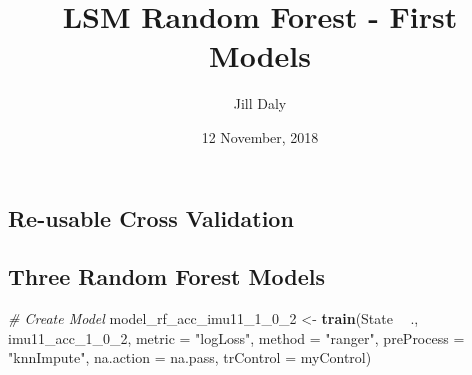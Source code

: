 \documentclass[]{article}
\title{LSM Random Forest - First Models}
\author{Jill Daly}
\date{12 November, 2018}
\newenvironment{Shaded}{\begin{snugshade}}{\end{snugshade}}
\newcommand{\CommentTok}[1]{\textcolor[rgb]{0.56,0.35,0.01}{\textit{#1}}}
\newcommand{\DataTypeTok}[1]{\textcolor[rgb]{0.13,0.29,0.53}{#1}}
\newcommand{\DecValTok}[1]{\textcolor[rgb]{0.00,0.00,0.81}{#1}}
\newcommand{\KeywordTok}[1]{\textcolor[rgb]{0.13,0.29,0.53}{\textbf{#1}}}
\newcommand{\NormalTok}[1]{#1}
\newcommand{\OperatorTok}[1]{\textcolor[rgb]{0.81,0.36,0.00}{\textbf{#1}}}
\newcommand{\OtherTok}[1]{\textcolor[rgb]{0.56,0.35,0.01}{#1}}
\newcommand{\StringTok}[1]{\textcolor[rgb]{0.31,0.60,0.02}{#1}}
\begin{document}
\maketitle

\hypertarget{re-usable-cross-validation}{%
\subsection{Re-usable Cross
Validation}\label{re-usable-cross-validation}}

\begin{Shaded}
\end{Shaded}

\hypertarget{three-random-forest-models}{%
\subsection{Three Random Forest
Models}\label{three-random-forest-models}}

\begin{Shaded}
\begin{Highlighting}[]
\CommentTok{# Create Model}
\NormalTok{model_rf_acc_imu11_}\DecValTok{1}\NormalTok{_}\DecValTok{0}\NormalTok{_}\DecValTok{2}\NormalTok{ <-}\StringTok{ }\KeywordTok{train}\NormalTok{(State }\OperatorTok{~}\StringTok{ }\NormalTok{., imu11_acc_}\DecValTok{1}\NormalTok{_}\DecValTok{0}\NormalTok{_}\DecValTok{2}\NormalTok{,}
                  \DataTypeTok{metric =} \StringTok{"logLoss"}\NormalTok{, }
                  \DataTypeTok{method =} \StringTok{"ranger"}\NormalTok{,}
                  \DataTypeTok{preProcess =} \StringTok{"knnImpute"}\NormalTok{,}
                  \DataTypeTok{na.action =}\NormalTok{ na.pass,}
                  \DataTypeTok{trControl =}\NormalTok{ myControl)}
\end{Highlighting}
\end{Shaded}
\end{document}
